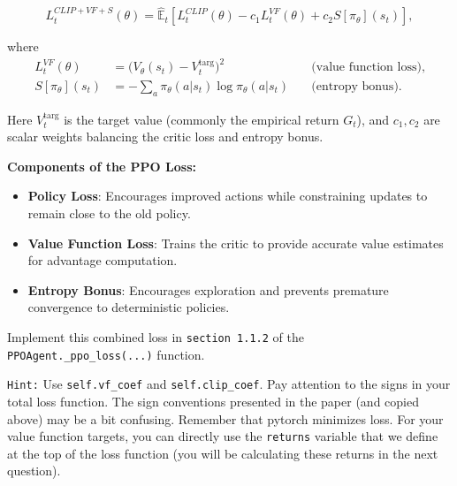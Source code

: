 \documentclass[12pt]{article}
\begin{document}
\begin{equation}
L_t^{CLIP+VF+S}(\theta) = \hat{\mathbb{E}}_t \left[ L_t^{CLIP}(\theta) - c_1 L_t^{VF}(\theta) + c_2 S[\pi_\theta](s_t) \right],
\end{equation}

where
\begin{align}
L_t^{VF}(\theta) &= \big(V_\theta(s_t) - V_t^{\text{targ}}\big)^2 \quad &\text{(value function loss)}, \\
S[\pi_\theta](s_t) &= -\sum_a \pi_\theta(a|s_t) \log \pi_\theta(a|s_t) \quad &\text{(entropy bonus)}.
\end{align}

Here $V_t^{\text{targ}}$ is the target value (commonly the empirical return $G_t$), and $c_1, c_2$ are scalar weights balancing the critic loss and entropy bonus.

\noindent
\textbf{Components of the PPO Loss:}
\begin{itemize}
    \item \textbf{Policy Loss}: Encourages improved actions while constraining updates to remain close to the old policy.
    \item \textbf{Value Function Loss}: Trains the critic to provide accurate value estimates for advantage computation.
    \item \textbf{Entropy Bonus}: Encourages exploration and prevents premature convergence to deterministic policies.
\end{itemize}

\noindent
Implement this combined loss in \texttt{section 1.1.2} of the \texttt{PPOAgent.\_ppo\_loss(...)} function.

\texttt{Hint:} Use \texttt{self.vf_coef} and \texttt{self.clip_coef}.  Pay attention to the signs in your total loss function.  The sign conventions presented in the paper (and copied above) may be a bit confusing.  Remember that pytorch minimizes loss.  For your value function targets, you can directly use the \texttt{returns} variable that we define at the top of the loss function (you will be calculating these returns in the next question).

\end{document}
